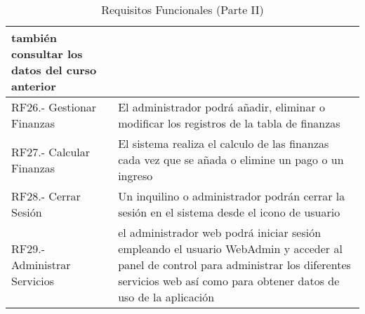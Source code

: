 \begin{appendices}
\begin{table}[H]
\begin{center}
\begin{tabular}{| p{5cm} | p{10cm} |}
			 también consultar los datos del curso anterior \\ \hline
			RF26.- Gestionar Finanzas &  El administrador podrá añadir, eliminar o modificar los registros de
			la tabla de finanzas\\ \hline
			RF27.- Calcular Finanzas & El sistema realiza el calculo de las finanzas cada vez que se añada o
			elimine un pago o un ingreso \\ \hline
			RF28.- Cerrar Sesión &  Un inquilino o administrador podrán cerrar la sesión en el sistema desde el
			icono de usuario \\ \hline
			RF29.- Administrar Servicios & el administrador web podrá iniciar sesión empleando el usuario
			WebAdmin y acceder al panel de control para administrar los diferentes servicios web así como
			para obtener datos de uso de la aplicación \\ \hline
		\end{tabular}	
		\egroup
		\caption{Requisitos Funcionales (Parte II)}
	\end{center}
\end{table}  


\end{appendices}
